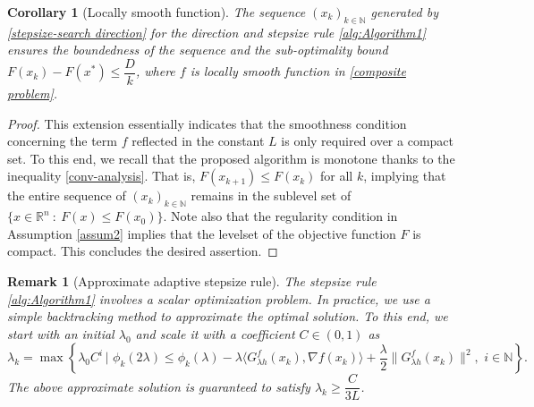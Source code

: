 \documentclass[11pt, a4paper, oneside, reqno]{amsart}
\newtheorem{remark}[theorem]{Remark}
\newtheorem{corollary}[theorem]{Corollary}
\begin{document}
\begin{corollary}[Locally smooth function]
The sequence $\left (x_k \right)_{k \in \mathbb{N}}$ generated by \eqref{stepsize-search direction} for the direction and stepsize rule \ref{alg:Algorithm1} ensures the boundedness of the sequence and the sub-optimality bound $F(x_k) - F(x^*) \leq \dfrac{D}{k}$, where $f$ is locally smooth function in \eqref{composite problem}.
\end{corollary}
\begin{proof}
This extension essentially indicates that the smoothness condition concerning the term $f$ reflected in the constant $L$ is only required over a compact set. To this end, we recall that the proposed algorithm is monotone thanks to the inequality \eqref{conv-analysis}. That is, $F(x_{k+1}) \leq F(x_k)$ for all $k$, implying that the entire sequence of $\left (x_k \right)_{k \in \mathbb{N}}$ remains in the sublevel set of $\{x \in \mathbb{R}^n ~:~ F(x) \le F(x_0)\}$. Note also that the regularity condition in Assumption \ref{assum2} implies that the levelset of the objective function $F$ is compact. This concludes the desired assertion. 
\end{proof}
\begin{remark}[Approximate adaptive stepsize rule] \label{stepsize appr}
    The stepsize rule \ref{alg:Algorithm1} involves a scalar optimization problem. In practice, we use a simple backtracking method to approximate the optimal solution. To this end, we start with an initial $\lambda_0$ and scale it with a coefficient $C \in (0,1)$ as 
\begin{equation}\label{back-line}
    \lambda_k = \max \left \{\lambda_0 C^i \,|\,\, \phi_k(2\lambda) \leq \phi_k(\lambda) - \lambda \langle G^{f}_{\lambda h}(x_k), \nabla f(x_k) \rangle + \dfrac{\lambda}{2}\|G^{f}_{\lambda h}(x_k)\|^2, \,\, i \in \mathbb{N}\right\}.
\end{equation}
The above approximate solution is guaranteed to satisfy $\lambda_k \geq \dfrac{C}{3L}$.
\end{remark}
\end{document}

